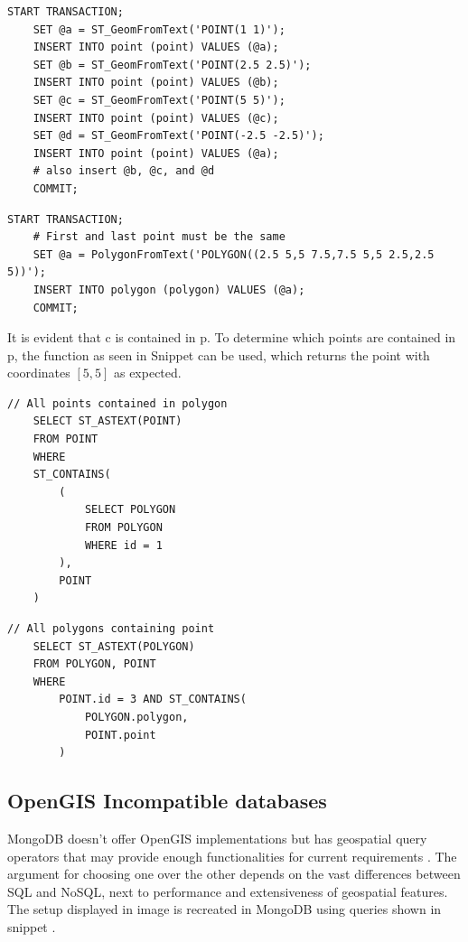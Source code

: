 \begin{multicols}{2}
	\begin{lstlisting}[caption={Insert four points}, label={lst:sql-insert-points}, belowskip=100pt]
	START TRANSACTION;
	SET @a = ST_GeomFromText('POINT(1 1)');
	INSERT INTO point (point) VALUES (@a);
	SET @b = ST_GeomFromText('POINT(2.5 2.5)');
	INSERT INTO point (point) VALUES (@b);
	SET @c = ST_GeomFromText('POINT(5 5)');
	INSERT INTO point (point) VALUES (@c);
	SET @d = ST_GeomFromText('POINT(-2.5 -2.5)');
	INSERT INTO point (point) VALUES (@a);
	# also insert @b, @c, and @d
	COMMIT;
\end{lstlisting}
	\begin{lstlisting}[caption={Insert polygon}, label={lst:sql-insert-polygon}, belowskip=0pt]
	START TRANSACTION;
	# First and last point must be the same
	SET @a = PolygonFromText('POLYGON((2.5 5,5 7.5,7.5 5,5 2.5,2.5 5))');
	INSERT INTO polygon (polygon) VALUES (@a);
	COMMIT;
\end{lstlisting}
\end{multicols}

It is evident that c is contained in p. To determine which points are contained in p, the function as seen in Snippet  can be used, which returns the point with coordinates $[5, 5]$ as expected.

\begin{multicols}{2}
	\begin{lstlisting}[caption={Select points contained in polygon}, label={lst:sql-pts-in-poly}, belowskip=100pt]
	// All points contained in polygon
	SELECT ST_ASTEXT(POINT)
	FROM POINT
	WHERE
	ST_CONTAINS(
		(
			SELECT POLYGON
			FROM POLYGON
			WHERE id = 1
		),
		POINT
	)
\end{lstlisting}
	\begin{lstlisting}[caption={Select polygons containing point}, label={lst:sql-poly-has-pt}, belowskip=0pt]
	// All polygons containing point
	SELECT ST_ASTEXT(POLYGON)
	FROM POLYGON, POINT
	WHERE
		POINT.id = 3 AND ST_CONTAINS(
			POLYGON.polygon,
			POINT.point
		)
\end{lstlisting}
\end{multicols}

\subsection{OpenGIS Incompatible databases}
MongoDB doesn’t offer OpenGIS implementations but has geospatial query operators that may provide enough functionalities for current requirements . The argument for choosing one over the other depends on the vast differences between SQL and NoSQL, next to performance and extensiveness of geospatial features. The setup displayed in image  is recreated in MongoDB using queries shown in snippet .

